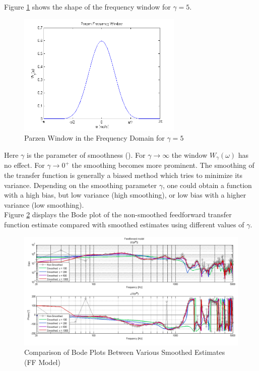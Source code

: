 Figure \ref{fig:parzen} shows the shape of the frequency window for $\gamma = 5$.


\begin{figure}[h]
\centering
\includegraphics[width=0.7\textwidth]{pics/parzen}
\caption{Parzen Window in the Frequency Domain for $\gamma = 5$ }
\label{fig:parzen}
\end{figure}



Here $\gamma$ is the parameter of smoothness (\cite{ljung1999system}). For $\gamma \rightarrow \infty$ the window $W_\gamma(\omega)$ has no effect. For $\gamma \rightarrow 0^+$ the smoothing becomes more prominent. The smoothing of the transfer function is generally a biased method which tries to minimize its variance. Depending on the smoothing parameter $\gamma$, one could obtain a function with a high bias, but low variance (high smoothing), or low bias with a higher variance (low smoothing). \\

Figure \ref{fig:FF_Smoothing} displays the Bode plot of the non-smoothed feedforward transfer function estimate compared with smoothed estimates using different values of $\gamma$.


\begin{figure}[h]
\centering
\includegraphics[width=1.0\textwidth]{pics/FF_Smoothing}
\caption{Comparison of Bode Plots Between Various Smoothed Estimates (FF Model)}
\label{fig:FF_Smoothing}
\end{figure}



